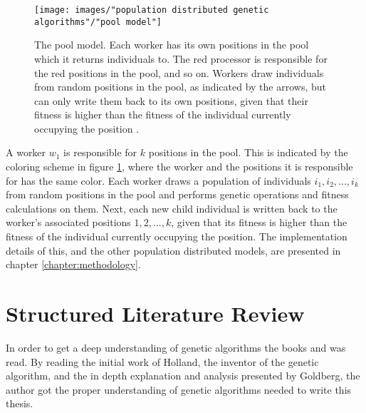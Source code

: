 \begin{figure}[h!]
\begin{center}
\texttt{[image: images/"population distributed genetic algorithms"/"pool model"]}
\caption{The pool model. Each worker has its own positions in the pool which it returns individuals to. The red processor is responsible for the red positions in the pool, and so on. Workers draw individuals from random positions in the pool, as indicated by the arrows, but can only write them back to its own positions, given that their fitness is higher than the fitness of the individual currently occupying the position \citep{Gong}.}
\label{Pool Model}
\end{center}
\end{figure}


\noindent A worker $w_1$ is responsible for $k$ positions in the pool. This is indicated by the coloring scheme in figure \ref{Pool Model}, where the worker and the positions it is responsible for has the same color. Each worker draws a population of individuals $i_1, i_2,...,i_k$ from random positions in the pool and performs genetic operations and fitness calculations on them. Next, each new child individual is written back to the worker's associated positions $1, 2,...,k$, given that its fitness is higher than the fitness of the individual currently occupying the position. The implementation details of this, and the other population distributed models, are presented in chapter \ref{chapter:methodology}.\\


\section{Structured Literature Review}\label{section:slr}
In order to get a deep understanding of genetic algorithms the books \cite{Holland} and \cite{Goldberg} was read. By reading the initial work of Holland, the inventor of the genetic algorithm, and the in depth explanation and analysis presented by Goldberg, the author got the proper understanding of genetic algorithms needed to write this thesis.\\

